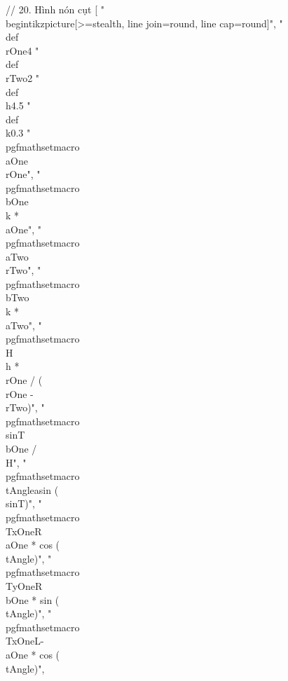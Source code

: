 // 20. Hình nón cụt
[
"\\begin{tikzpicture}[>=stealth, line join=round, line cap=round]",
"\t\\def\\rOne{4} %
"\t\\def\\rTwo{2} %
"\t\\def\\h{4.5} %
"\t\\def\\k{0.3} %
"\t\\pgfmathsetmacro{\\aOne}{\\rOne}",
"\t\\pgfmathsetmacro{\\bOne}{\\k * \\aOne}",
"\t\\pgfmathsetmacro{\\aTwo}{\\rTwo}",
"\t\\pgfmathsetmacro{\\bTwo}{\\k * \\aTwo}",
"\t\\pgfmathsetmacro{\\H}{\\h * \\rOne / (\\rOne - \\rTwo)}",
"\t\\pgfmathsetmacro{\\sinT}{\\bOne / \\H}",
"\t\\pgfmathsetmacro{\\tAngle}{asin (\\sinT)}",
"\t\\pgfmathsetmacro{\\TxOneR}{\\aOne * cos (\\tAngle)}",
"\t\\pgfmathsetmacro{\\TyOneR}{\\bOne * sin (\\tAngle)}",
"\t\\pgfmathsetmacro{\\TxOneL}{-\\aOne * cos (\\tAngle)}",
